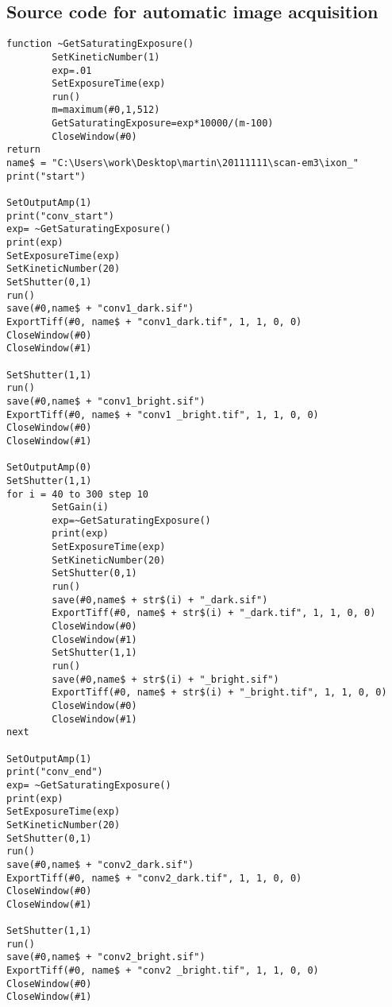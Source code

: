 \subsection{Source code for automatic image acquisition}
\begin{verbatim}
function ~GetSaturatingExposure()
        SetKineticNumber(1)
        exp=.01
        SetExposureTime(exp)
        run()
        m=maximum(#0,1,512)
        GetSaturatingExposure=exp*10000/(m-100)
        CloseWindow(#0)
return
name$ = "C:\Users\work\Desktop\martin\20111111\scan-em3\ixon_"
print("start")

SetOutputAmp(1)
print("conv_start")
exp= ~GetSaturatingExposure()
print(exp)
SetExposureTime(exp)
SetKineticNumber(20)
SetShutter(0,1)
run()
save(#0,name$ + "conv1_dark.sif")
ExportTiff(#0, name$ + "conv1_dark.tif", 1, 1, 0, 0)
CloseWindow(#0)
CloseWindow(#1)
        
SetShutter(1,1)
run()
save(#0,name$ + "conv1_bright.sif")
ExportTiff(#0, name$ + "conv1 _bright.tif", 1, 1, 0, 0)
CloseWindow(#0)
CloseWindow(#1)

SetOutputAmp(0)
SetShutter(1,1)
for i = 40 to 300 step 10
        SetGain(i)
        exp=~GetSaturatingExposure()
        print(exp)
        SetExposureTime(exp)
        SetKineticNumber(20)
        SetShutter(0,1)
        run()
        save(#0,name$ + str$(i) + "_dark.sif")
        ExportTiff(#0, name$ + str$(i) + "_dark.tif", 1, 1, 0, 0)
        CloseWindow(#0)
        CloseWindow(#1)
        SetShutter(1,1)
        run()
        save(#0,name$ + str$(i) + "_bright.sif")
        ExportTiff(#0, name$ + str$(i) + "_bright.tif", 1, 1, 0, 0)
        CloseWindow(#0)
        CloseWindow(#1)
next

SetOutputAmp(1)
print("conv_end")
exp= ~GetSaturatingExposure()
print(exp)
SetExposureTime(exp)
SetKineticNumber(20)
SetShutter(0,1)
run()
save(#0,name$ + "conv2_dark.sif")
ExportTiff(#0, name$ + "conv2_dark.tif", 1, 1, 0, 0)
CloseWindow(#0)
CloseWindow(#1)
        
SetShutter(1,1)
run()
save(#0,name$ + "conv2_bright.sif")
ExportTiff(#0, name$ + "conv2 _bright.tif", 1, 1, 0, 0)
CloseWindow(#0)
CloseWindow(#1)
\end{verbatim}

